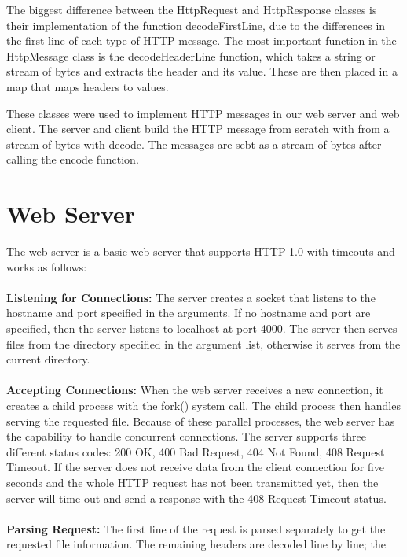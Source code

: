 \documentclass{article}
\begin{document}
    The biggest difference between the HttpRequest and HttpResponse classes is
    their implementation of the function decodeFirstLine, due to the
    differences in the first line of each type of HTTP message. The most
    important function in the HttpMessage class is the decodeHeaderLine
    function, which takes a string or stream of bytes and extracts the header
    and its value. These are then placed in a map that maps headers to values.
    
    These classes were used to implement HTTP messages in our web server and
    web client. The server and client build the HTTP message from scratch with
    from a stream of bytes with decode. The messages are sebt as a stream of
    bytes after calling the encode function.

\section{Web Server}
    The web server is a basic web server that supports HTTP 1.0 with timeouts
    and works as follows: \\ \\
    \textbf{Listening for Connections:}
        The server creates a socket that listens to the hostname and port
        specified in the arguments. If no hostname and port are specified, then
        the server listens to localhost at port 4000. The server then serves
        files from the directory specified in the argument list, otherwise it
        serves from the current directory. \\ \\
    \textbf{Accepting Connections:}
        When the web server receives a new connection, it creates a child
        process with the fork() system call. The child process then handles
        serving the requested file. Because of these parallel processes, the
        web server has the capability to handle concurrent connections. The
        server supports three different status codes: 200 OK, 400 Bad Request,
        404 Not Found, 408 Request Timeout. If the server does not receive data
        from the client connection for five seconds and the whole HTTP request
        has not been transmitted yet, then the server will time out and send a
        response with the 408 Request Timeout status. \\ \\
    \textbf{Parsing Request:}
        The first line of the request is parsed separately to get the requested
        file information. The remaining headers are decoded line by line; the
\end{document}
